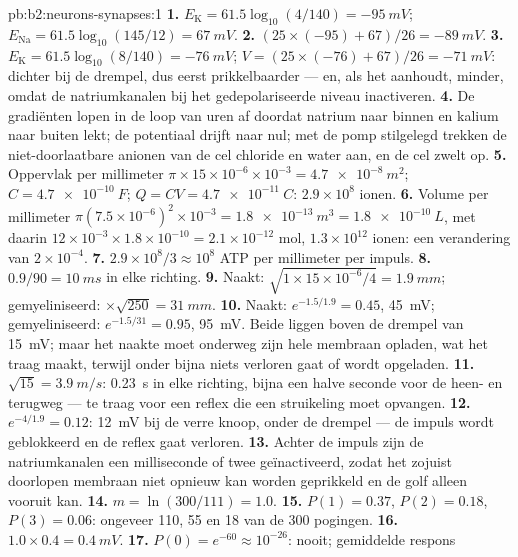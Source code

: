 \begin{solution}{pb:b2:neurons-synapses:1}
\textbf{1.} $E_{\mathrm K} = 61.5\log_{10}(4/140) = \qty{-95}{mV}$;
$E_{\mathrm{Na}} = 61.5\log_{10}(145/12) = \qty{+67}{mV}$.
\textbf{2.} $(25\times(-95) + 67)/26 = \qty{-89}{mV}$.
\textbf{3.} $E_{\mathrm K} = 61.5\log_{10}(8/140) = \qty{-76}{mV}$;
$V = (25\times(-76) + 67)/26 = \qty{-71}{mV}$: dichter bij de drempel,
dus eerst prikkelbaarder --- en, als het aanhoudt, minder, omdat de
natriumkanalen bij het gedepolariseerde niveau inactiveren.
\textbf{4.} De gradiënten lopen in de loop van uren af doordat natrium naar
binnen en kalium naar buiten lekt; de potentiaal drijft naar nul; met de pomp
stilgelegd trekken de niet-doorlaatbare anionen van de cel chloride en water
aan, en de cel zwelt op.
\textbf{5.} Oppervlak per millimeter $\pi\times 15\times 10^{-6}\times
10^{-3} = \qty{4.7e-8}{m^2}$; $C = \qty{4.7e-10}{F}$; $Q = CV =
\qty{4.7e-11}{C}$: $2.9\times 10^{8}$ ionen.
\textbf{6.} Volume per millimeter $\pi(7.5\times 10^{-6})^{2}\times
10^{-3} = \qty{1.8e-13}{m^3} = \qty{1.8e-10}{L}$, met daarin $12\times
10^{-3}\times 1.8\times 10^{-10} = 2.1\times 10^{-12}$ mol, $1.3\times
10^{12}$ ionen: een verandering van $2\times 10^{-4}$.
\textbf{7.} $2.9\times 10^{8}/3 \approx 10^{8}$ ATP per millimeter per
impuls.
\textbf{8.} $0.9/90 = \qty{10}{ms}$ in elke richting.
\textbf{9.} Naakt: $\sqrt{1\times 15\times 10^{-6}/4} = \qty{1.9}{mm}$;
gemyeliniseerd: $\times\sqrt{250} = \qty{31}{mm}$.
\textbf{10.} Naakt: $e^{-1.5/1.9} = 0.45$, \qty{45}{mV}; gemyeliniseerd:
$e^{-1.5/31} = 0.95$, \qty{95}{mV}. Beide liggen boven de drempel van
\qty{15}{mV}; maar het naakte  moet onderweg zijn hele membraan opladen,
wat het traag maakt, terwijl onder  bijna niets verloren gaat of
wordt opgeladen.
\textbf{11.} $\sqrt{15} = \qty{3.9}{m/s}$: \qty{0.23}{s} in elke richting,
bijna een halve seconde voor de heen- en terugweg --- te traag voor een reflex
die een struikeling moet opvangen.
\textbf{12.} $e^{-4/1.9} = 0.12$: \qty{12}{mV} bij de verre knoop, onder
de drempel --- de impuls wordt geblokkeerd en de reflex gaat verloren.
\textbf{13.} Achter de impuls zijn de natriumkanalen een milliseconde of twee
geïnactiveerd, zodat het zojuist doorlopen membraan niet opnieuw kan worden
geprikkeld en de golf alleen vooruit kan.
\textbf{14.} $m = \ln(300/111) = 1.0$.
\textbf{15.} $P(1) = 0.37$, $P(2) = 0.18$, $P(3) = 0.06$: ongeveer 110, 55
en 18 van de 300 pogingen.
\textbf{16.} $1.0\times 0.4 = \qty{0.4}{mV}$.
\textbf{17.} $P(0) = e^{-60} \approx 10^{-26}$: nooit; gemiddelde respons

\end{solution}
